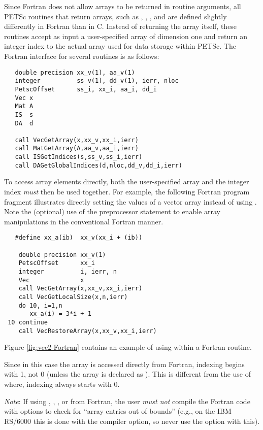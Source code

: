Since Fortran does not allow arrays to be returned in routine
arguments, all PETSc routines that return arrays, such as 
, , 
, and 
are defined slightly differently in Fortran than in C.  
  
 
Instead of returning the array itself, these routines
accept as input a user-specified array of dimension one and return an
integer index to the actual array used for data storage within PETSc.
The Fortran interface for several routines is as follows:
\begin{verbatim}
   double precision xx_v(1), aa_v(1)
   integer          ss_v(1), dd_v(1), ierr, nloc
   PetscOffset      ss_i, xx_i, aa_i, dd_i
   Vec x
   Mat A
   IS  s
   DA  d

   call VecGetArray(x,xx_v,xx_i,ierr)
   call MatGetArray(A,aa_v,aa_i,ierr)
   call ISGetIndices(s,ss_v,ss_i,ierr)
   call DAGetGlobalIndices(d,nloc,dd_v,dd_i,ierr)
\end{verbatim}

To access array elements directly, both the user-specified array and
the integer index {\em must} then be used together.  
For example, the following Fortran program fragment illustrates
directly setting the values of a vector array instead of using .  Note the (optional) use of the preprocessor 
 statement to enable array manipulations in the conventional
Fortran manner.
\begin{verbatim}
   #define xx_a(ib)  xx_v(xx_i + (ib))

    double precision xx_v(1)
    PetscOffset      xx_i
    integer          i, ierr, n
    Vec              x
    call VecGetArray(x,xx_v,xx_i,ierr)
    call VecGetLocalSize(x,n,ierr)
    do 10, i=1,n
       xx_a(i) = 3*i + 1
 10 continue
    call VecRestoreArray(x,xx_v,xx_i,ierr)
\end{verbatim}
Figure \ref{fig:vec2-Fortran} contains an example of using 
within a Fortran routine.

Since in this case the array is accessed directly from Fortran,
indexing begins with 1, not 0 (unless the array is declared as ).
This is different from the use of 
where, indexing always starts with 0.

{\em Note}: If using , , ,
or 
from Fortran, the user {\em must not} compile the Fortran code with options 
to check for ``array entries out of bounds'' (e.g., on the IBM RS/6000 this 
is done with the  compiler option, so never use the  option with this).

